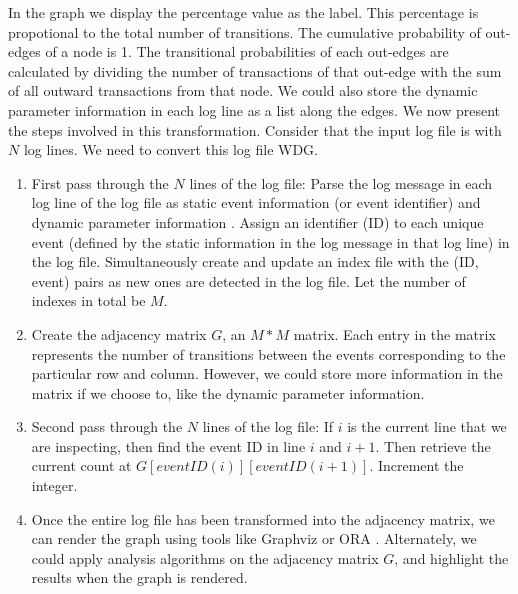 \begin{enumerate}
In the graph we display the percentage value as the label. This percentage is propotional to the total number of transitions.  The cumulative probability of out-edges of a node is 1. The transitional probabilities of each out-edges are calculated by dividing the number of transactions of that out-edge with the sum of all outward transactions from that node. We could also store the dynamic parameter information in each log line as a list along the edges. We now present the steps involved in this transformation. Consider that the input log file is with $N$ log lines. We need to convert this log file WDG.
\begin{enumerate}
\item First pass through the $N$ lines of the log file: Parse the log message in each log line of the log file as static event information (or event identifier) and dynamic parameter information \cite{mnv10}. Assign an identifier (ID) to each unique event (defined by the static information in the log message in that log line) in the log file. Simultaneously create and update an index file with the (ID, event) pairs as new ones are detected in the log file. Let the number of indexes in total be $M$.
\item Create the adjacency matrix $G$, an $M*M$ matrix. Each entry in the matrix represents the number of transitions between the events corresponding to the particular row and column. However, we could store more information in the matrix if we choose to, like the dynamic parameter information. 
\item Second pass through the $N$ lines of the log file: If $i$ is the current line that we are inspecting, then find the event ID in line $i$ and $i+1$. Then retrieve the current count at $G[eventID(i)][eventID(i+1)]$. Increment the integer.
\item Once the entire log file has been transformed into the adjacency matrix, we can render the graph using tools like Graphviz \cite{gviz} or ORA \cite{ora}.  Alternately, we could apply analysis algorithms on the adjacency matrix $G$, and highlight the results when the graph is rendered.
\end{enumerate}



\end{enumerate}
